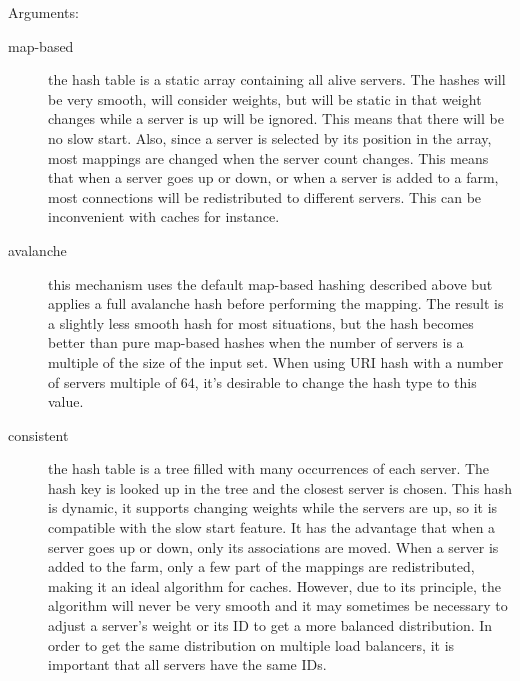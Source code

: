   Arguments:
  \begin{description}
  \item[map-based]
                the hash table is a static array containing all alive servers.
                The hashes will be very smooth, will consider weights, but will
                be static in that weight changes while a server is up will be
                ignored. This means that there will be no slow start. Also,
                since a server is selected by its position in the array, most
                mappings are changed when the server count changes. This means
                that when a server goes up or down, or when a server is added
                to a farm, most connections will be redistributed to different
                servers. This can be inconvenient with caches for instance.

  \item[avalanche]
                this mechanism uses the default map-based hashing described
                above but applies a full avalanche hash before performing the
                mapping. The result is a slightly less smooth hash for most
                situations, but the hash becomes better than pure map-based
                hashes when the number of servers is a multiple of the size of
                the input set. When using URI hash with a number of servers
                multiple of 64, it's desirable to change the hash type to
                this value.

  \item[consistent]
                the hash table is a tree filled with many occurrences of each
                server. The hash key is looked up in the tree and the closest
                server is chosen. This hash is dynamic, it supports changing
                weights while the servers are up, so it is compatible with the
                slow start feature. It has the advantage that when a server
                goes up or down, only its associations are moved. When a server
                is added to the farm, only a few part of the mappings are
                redistributed, making it an ideal algorithm for caches.
                However, due to its principle, the algorithm will never be very
                smooth and it may sometimes be necessary to adjust a server's
                weight or its ID to get a more balanced distribution. In order
                to get the same distribution on multiple load balancers, it is
                important that all servers have the same IDs.
  \end{description}

